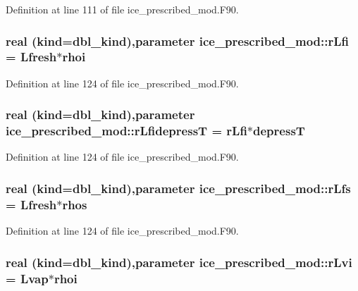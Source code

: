 Definition at line 111 of file ice\_\-prescribed\_\-mod.F90.\hypertarget{namespaceice__prescribed__mod_a39606ec992e07a82b93638f009662c22}{
\subsubsection[{rLfi}]{\setlength{\rightskip}{0pt plus 5cm}real (kind=dbl\_\-kind),parameter {\bf ice\_\-prescribed\_\-mod::rLfi} = Lfresh$\ast$rhoi}}
\label{namespaceice__prescribed__mod_a39606ec992e07a82b93638f009662c22}


Definition at line 124 of file ice\_\-prescribed\_\-mod.F90.\hypertarget{namespaceice__prescribed__mod_a5331e73657db370f6bc527f0e680a647}{
\subsubsection[{rLfidepressT}]{\setlength{\rightskip}{0pt plus 5cm}real (kind=dbl\_\-kind),parameter {\bf ice\_\-prescribed\_\-mod::rLfidepressT} = {\bf rLfi}$\ast$depressT}}
\label{namespaceice__prescribed__mod_a5331e73657db370f6bc527f0e680a647}


Definition at line 124 of file ice\_\-prescribed\_\-mod.F90.\hypertarget{namespaceice__prescribed__mod_a6d6aa0ced82499b6a9e9fef93efc4215}{
\subsubsection[{rLfs}]{\setlength{\rightskip}{0pt plus 5cm}real (kind=dbl\_\-kind),parameter {\bf ice\_\-prescribed\_\-mod::rLfs} = Lfresh$\ast$rhos}}
\label{namespaceice__prescribed__mod_a6d6aa0ced82499b6a9e9fef93efc4215}


Definition at line 124 of file ice\_\-prescribed\_\-mod.F90.\hypertarget{namespaceice__prescribed__mod_a142d1bc283475ba8d20f1f9693a7f0a7}{
\subsubsection[{rLvi}]{\setlength{\rightskip}{0pt plus 5cm}real (kind=dbl\_\-kind),parameter {\bf ice\_\-prescribed\_\-mod::rLvi} = Lvap$\ast$rhoi}}
\label{namespaceice__prescribed__mod_a142d1bc283475ba8d20f1f9693a7f0a7}



